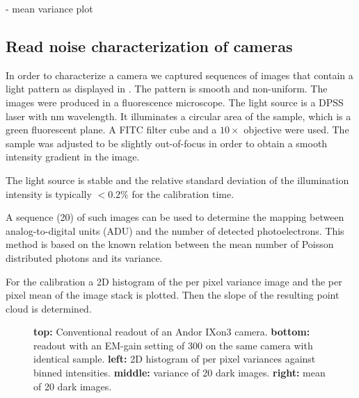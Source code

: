 - mean variance plot

\subsection{Read noise characterization of cameras}

In order to characterize a camera we captured sequences of images that
contain a light pattern as displayed in . The
pattern is smooth and non-uniform.  
  The images were produced in a
fluorescence microscope. The light source is a DPSS laser with
\unit[473]{nm} wavelength. It illuminates a circular area of the
sample, which is a green fluorescent plane. A FITC filter cube and a
$10\times$ objective were used. The sample was adjusted to be slightly
out-of-focus in order to obtain a smooth intensity gradient in the
image.

The light source is stable and the relative standard deviation of the
illumination intensity is typically $<0.2\%$ for the calibration
time. 

A sequence (20) of such images can be used to determine the mapping
between analog-to-digital units (ADU)
 and the number of detected
photoelectrons. This method is based on the known relation between the
mean number of Poisson distributed photons and its variance.

For the calibration a 2D histogram of the per pixel
variance image and the per pixel mean of the image stack is
plotted. Then the slope of the resulting point cloud is determined.

\begin{figure}
  \centering
  \caption{{\bf top:} Conventional readout of an Andor IXon3
    camera. {\bf bottom:} readout with an EM-gain setting of 300 on
    the same camera with identical sample. {\bf left:} 2D histogram of
    per pixel variances against binned intensities. {\bf middle:}
    variance of 20 dark images. {\bf right:} mean of 20 dark images.}
  \label{fig:ixon}
\end{figure}
  

